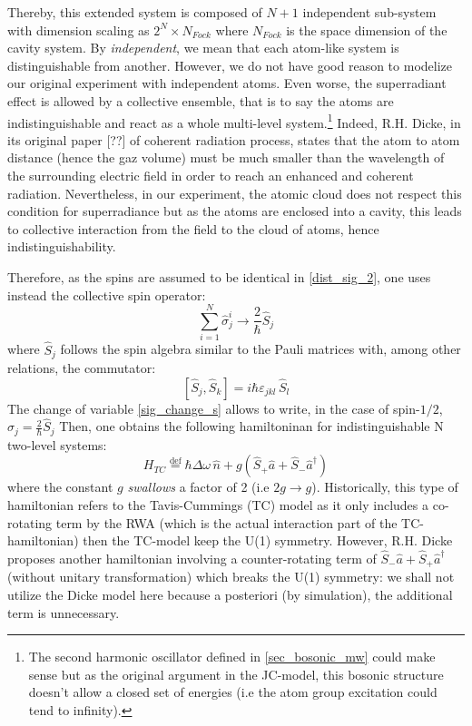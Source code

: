 \documentclass[10pt]{report}
\begin{document}
Thereby, this extended system is composed of $N+1$ independent sub-system with dimension scaling as $2^N \times N_{Fock}$ where $N_{Fock}$ is the space dimension of the cavity system. By \textit{independent}, we mean that each atom-like system is distinguishable from another. However, we do not have good reason to modelize our original experiment with independent atoms. Even worse, the superradiant effect is allowed by a collective ensemble, that is to say the atoms are indistinguishable and react as a whole multi-level system.\footnote{The second harmonic oscillator defined in \eqref{sec_bosonic_mw} could make sense but as the original argument in the JC-model, this bosonic structure doesn't allow a closed set of energies (i.e the atom group excitation could tend to infinity).} Indeed, R.H. Dicke, in its original paper [??] of coherent radiation process, states that the atom to atom distance (hence the gaz volume) must be much smaller than the wavelength of the surrounding electric field in order to reach an enhanced and coherent radiation. Nevertheless, in our experiment, the atomic cloud does not respect this condition for superradiance but as the atoms are enclosed into a cavity, this leads to collective interaction from the field to the cloud of atoms, hence indistinguishability.

Therefore, as the spins are assumed to be identical in \eqref{dist_sig_2}, one uses instead the collective spin operator:
\begin{equation}
\label{sig_change_s}
\sum_{i=1}^{N} \hat{\sigma}_j^i \rightarrow \frac{2}{\hbar} \hat{S}_j
\end{equation}
where $\hat{S}_j$ follows the spin algebra similar to the Pauli matrices with, among other relations, the commutator:
\begin{equation}
{\displaystyle [\hat{S} _{j},\hat{S} _{k}]=i\hbar\varepsilon _{jkl}\,\hat{S} _{l}}
\end{equation}
The change of variable \eqref{sig_change_s} allows to write, in the case of spin-$1/2$, $\hat{\sigma}_j = \frac{2}{\hbar}\hat{S}_j$ Then, one obtains the following hamiltoninan for indistinguishable N two-level systems:
\begin{equation}
H_{TC} \stackrel{\text{def}}{=} \hbar\Delta\omega\,\hat{n} + g \left(\hat{S}_+ \hat{a} + \hat{S}_-\hat{a}^{\dag} \right)
\end{equation}
where the constant $g$ \textit{swallows} a factor of 2 (i.e $2g \rightarrow g$). Historically, this type of hamiltonian refers to the Tavis-Cummings (TC) model as it only includes a co-rotating term by the RWA (which is the actual interaction part of the TC-hamiltonian) then the TC-model keep the U(1) symmetry. However, R.H. Dicke proposes another hamiltonian involving a counter-rotating term of $\hat{S}_- \hat{a} + \hat{S}_+\hat{a}^{\dag}$ (without unitary transformation) which breaks the U(1) symmetry: we shall not utilize the Dicke model here because a posteriori (by simulation), the additional term is unnecessary.
\end{document}

